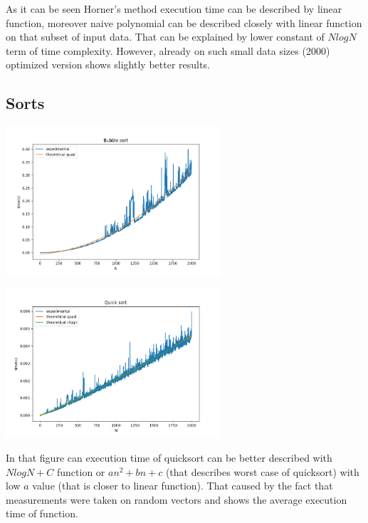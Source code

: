 As it can be seen Horner's method execution time can be described by linear function, moreover naive polynomial can be described
closely with linear function on that subset of input data. That can be explained by lower constant of $NlogN$ term of time complexity. However, already on such small data sizes (2000) optimized version shows slightly better results.

\subsection*{Sorts}

\begin{center}
    \includegraphics[width=0.6\textwidth]{../results/bubble_sort.png}
\end{center}

\begin{center}
    \includegraphics[width=0.6\textwidth]{../results/quick_sort.png}
\end{center}

In that figure can execution time of quicksort can be better described with $NlogN + C$ function or $a n^2 + b n + c$ (that describes worst case of quicksort) with low $a$ value (that is closer to linear function).
That caused by the fact that measurements were taken on random vectors and shows the average execution time of function. 


